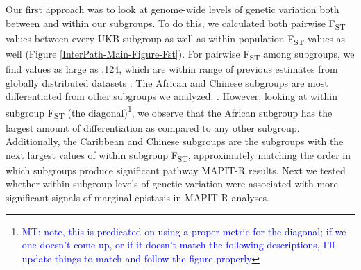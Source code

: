 \documentclass[12pt,a4paper]{article}
\begin{document}
Our first approach was to look at genome-wide levels of genetic variation both between and within our subgroups. To do this, we calculated both pairwise F\textsubscript{ST} values between every UKB subgroup as well as within population F\textsubscript{ST} values as well (Figure \ref{InterPath-Main-Figure-Fst}). For pairwise F\textsubscript{ST} among subgroups, we find values as large as .124, which are within range of previous estimates from globally distributed datasets \citep{Ramachandran2005,Weir2005,Henn2011,Wang2012,Sugden2016}. The African and Chinese subgroups are most differentiated from other subgroups we analyzed. . However, looking at within subgroup F\textsubscript{ST} (the diagonal)\footnote{\textcolor{blue}{MT: note, this is predicated on using a proper metric for the diagonal; if we one doesn't come up, or if it doesn't match the following descriptions, I'll update things to match and follow the figure properly}}, we observe that the African subgroup has the largest amount of differentiation as compared to any other subgroup. Additionally, the Caribbean and Chinese subgroups are the subgroups with the next largest values of within subgroup F\textsubscript{ST}, approximately matching the order in which subgroups produce significant pathway MAPIT-R results. Next we tested whether within-subgroup levels of genetic variation were associated with more significant signals of marginal epistasis in MAPIT-R analyses.
\end{document}
